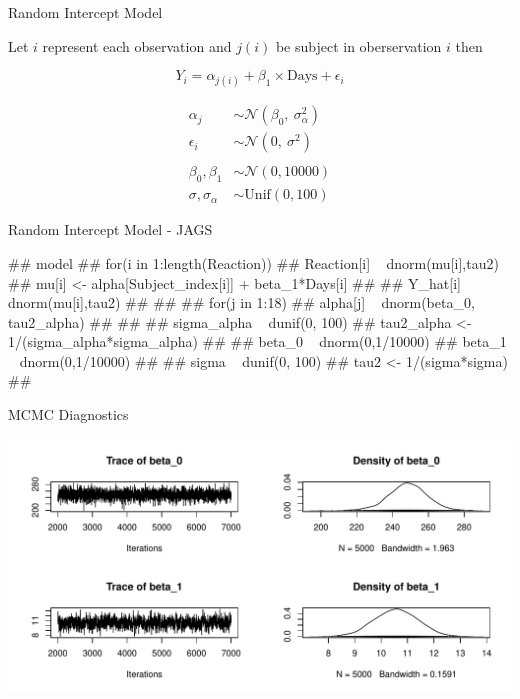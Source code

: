 \documentclass[11pt,ignorenonframetext,]{beamer}
\let\oldverbatim\verbatim
\let\endoldverbatim\endverbatim
\renewenvironment{verbatim}{\footnotesize\begin{spacing}{0.9}\oldverbatim}{\endoldverbatim\end{spacing}}
\begin{document}
\begin{frame}{Random Intercept Model}

Let \(i\) represent each observation and \(j(i)\) be subject in
oberservation \(i\) then

\[ Y_i = \alpha_{j(i)}+ \beta_1 \times \text{Days} + \epsilon_i \]

\[
\begin{aligned}
\alpha_j &\sim \mathcal{N}(\beta_0,~\sigma^2_\alpha)  \\
\epsilon_i &\sim \mathcal{N}(0,~\sigma^2) \\
\\
\beta_0, \beta_1 &\sim \mathcal{N}(0, 10000)\\
\sigma, \sigma_\alpha &\sim \text{Unif}(0,100)
\end{aligned}
\]

\end{frame}

\begin{frame}[fragile]{Random Intercept Model - JAGS}

\begin{verbatim}
## model{
##   for(i in 1:length(Reaction)) {
##     Reaction[i] ~ dnorm(mu[i],tau2)
##     mu[i] <- alpha[Subject_index[i]] + beta_1*Days[i]
## 
##     Y_hat[i] ~ dnorm(mu[i],tau2)
##   }
## 
##   for(j in 1:18) {
##     alpha[j] ~ dnorm(beta_0, tau2_alpha)
##   }
##   
##   sigma_alpha ~ dunif(0, 100) 
##   tau2_alpha <- 1/(sigma_alpha*sigma_alpha)
## 
##   beta_0 ~ dnorm(0,1/10000)
##   beta_1 ~ dnorm(0,1/10000)
## 
##   sigma ~ dunif(0, 100) 
##   tau2 <- 1/(sigma*sigma)
## }
\end{verbatim}

\end{frame}

\begin{frame}{MCMC Diagnostics}

\begin{center}\includegraphics{Lec5_files/figure-beamer/unnamed-chunk-14-1} \end{center}

\end{frame}
\end{document}
